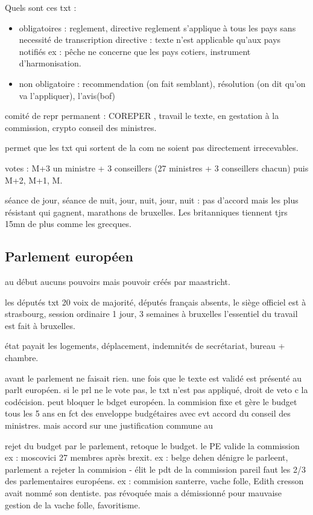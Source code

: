 \documentclass[a4paper,12pt]{article}
\begin{document}
Quels sont ces txt :

\begin{itemize}
	\item obligatoires : reglement, directive
	reglement s'applique à tous les pays sans necessité de transcription
	directive : texte n'est applicable qu'aux pays notifiés ex : pêche ne concerne que les pays cotiers,
	instrument d'harmonisation.
	
	\item non obligatoire : recommendation (on fait semblant), résolution (on dit qu'on va l'appliquer), l'avis(bof)
\end{itemize}






comité de repr permanent : COREPER  , travail le texte, en gestation à la commission, crypto conseil des ministres.

permet que les txt qui sortent de la com ne soient pas directement irrecevables.

votes : M+3 un ministre + 3 conseillers    (27 ministres + 3 conseillers chacun)
puis M+2, M+1, M.

séance de jour, séance de  nuit, jour, nuit, jour, nuit : pas d'accord mais les plus résistant qui gagnent, marathons de
bruxelles. Les britanniques tiennent tjrs 15mn de plus comme les grecques.


\subsection{Parlement européen}

au début aucuns pouvoirs mais pouvoir créés par maastricht.

les députés 
txt 20 voix de majorité, députés français absents, le siège officiel est  à strasbourg, session ordinaire 1 jour,
3 semaines à bruxelles l'essentiel du travail est fait à bruxelles.

état payait les logements, déplacement, indemnités de secrétariat, bureau + chambre.

avant le parlement ne faisait rien.
une fois que le texte est validé est présenté au parlt européen.
si le prl ne le vote pas, le txt n'est pas appliqué, droit de veto c la codécision.
peut bloquer le bdget européen.
la commision fixe et gère le budget tous les 5 ans en fct des enveloppe budgétaires avec evt accord
du conseil des ministres. 
mais accord sur une justification commune au 

rejet du budget par le parlement, retoque le budget.
le PE valide la commission ex : moscovici 27 membres après brexit.
ex : belge dehen dénigre le parleent, parlement a rejeter la commision
- élit le pdt de la commission pareil faut les 2/3 des parlementaires européens.
ex : commision santerre, vache folle, Edith cresson avait nommé son dentiste.
pas révoquée mais a démissionné pour mauvaise gestion de la vache folle, favoritisme.
\end{document}

